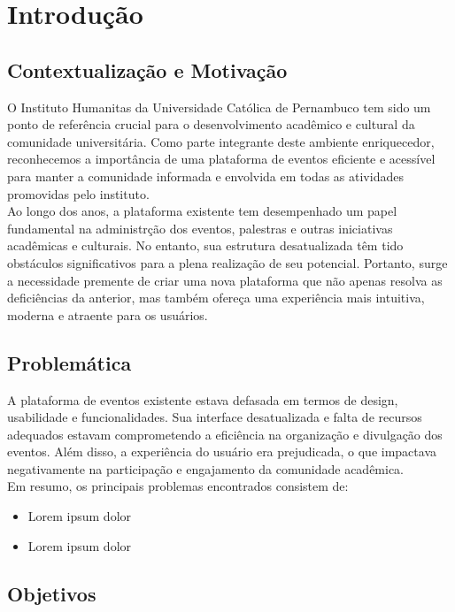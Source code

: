 \chapter{Introdução}

\section{Contextualização e Motivação}

O Instituto Humanitas da Universidade Católica de Pernambuco tem sido um ponto de referência crucial para o desenvolvimento acadêmico e cultural da comunidade universitária. Como parte integrante deste ambiente enriquecedor, reconhecemos a importância de uma plataforma de eventos eficiente e acessível para manter a comunidade informada e envolvida em todas as atividades promovidas pelo instituto. \\

Ao longo dos anos, a plataforma existente tem desempenhado um papel fundamental na administrção dos eventos, palestras e outras iniciativas acadêmicas e culturais. No entanto, sua estrutura desatualizada têm tido obstáculos significativos para a plena realização de seu potencial. Portanto, surge a necessidade premente de criar uma nova plataforma que não apenas resolva as deficiências da anterior, mas também ofereça uma experiência mais intuitiva, moderna e atraente para os usuários.

\section{Problemática}
A plataforma de eventos existente estava defasada em termos de design, usabilidade e funcionalidades. Sua interface desatualizada e falta de recursos adequados estavam comprometendo a eficiência na organização e divulgação dos eventos. Além disso, a experiência do usuário era prejudicada, o que impactava negativamente na participação e engajamento da comunidade acadêmica. \\

Em resumo, os principais problemas encontrados consistem de:

\begin{itemize}
    \item Lorem ipsum dolor
    \item Lorem ipsum dolor
\end{itemize} 

\section{Objetivos}


